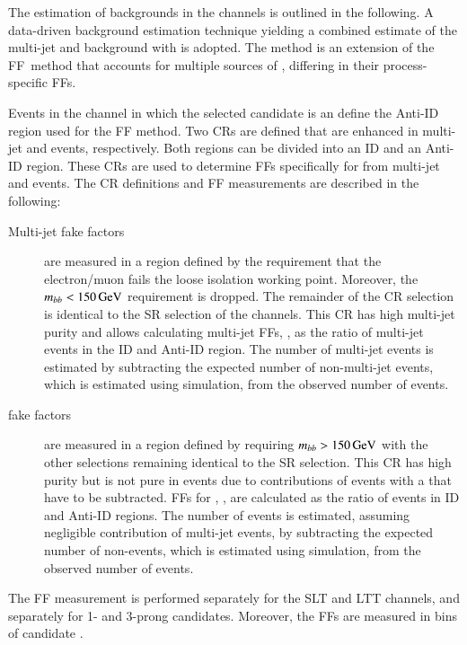 The estimation of \faketauhadvisC backgrounds in the \lephad channels is outlined
in the following. A data-driven background estimation technique yielding a
combined estimate of the multi-jet and \ttbar background with \faketauhadvis is
adopted. The method is an extension of the FF~method
that accounts for multiple sources of \faketauhadvis, differing in their
process-specific FFs.

Events in the \lephad channel in which the selected \tauhadvis candidate is an
\antitau define the Anti-ID region used for the FF method. Two CRs are defined
that are enhanced in multi-jet and \ttbar events, respectively. Both regions can
be divided into an ID and an Anti-ID region. These CRs are used to determine FFs
specifically for \faketauhadvis from multi-jet and \ttbar events. The CR
definitions and FF measurements are described in the following:
\begin{description}

\item[Multi-jet fake factors] are measured in a region defined by the
  requirement that the electron/muon fails the loose isolation working
  point. Moreover, the $m_{bb} < \SI{150}{\ensuremath{\text{GeV}}}$ requirement is dropped. The
  remainder of the CR selection is identical to the SR selection of the \lephad
  channels. This CR has high multi-jet purity and allows calculating multi-jet
  FFs, \FFqcd, as the ratio of multi-jet events in the ID and Anti-ID
  region. The number of multi-jet events is estimated by subtracting the
  expected number of non-multi-jet events, which is estimated using simulation,
  from the observed number of events.

\item[\ttbar fake factors] are measured in a region defined by requiring
  $m_{bb} > \SI{150}{\ensuremath{\text{GeV}}}$ with the other selections remaining identical to the
  SR selection. This CR has high \ttbar purity but is not pure in \ttbarFakes
  events due to contributions of \ttbar events with a \truetauhadvis that have
  to be subtracted. FFs for \ttbar, \FFttbar, are calculated as the ratio of
  \ttbarFakes events in ID and Anti-ID regions. The number of \ttbarFakes events
  is estimated, assuming negligible contribution of multi-jet events, by
  subtracting the expected number of non-\ttbarFakes events, which is estimated
  using simulation, from the observed number of events.

\end{description}
The FF measurement is performed separately for the \lephad SLT and LTT channels,
and separately for 1- and 3-prong \tauhadvis candidates. Moreover, the FFs are
measured in bins of \tauhadvis candidate \pT.

